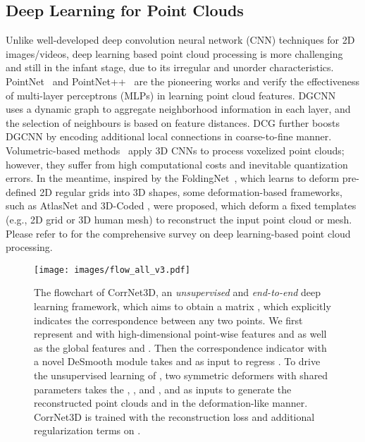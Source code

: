 \documentclass[final]{cvpr}
\begin{document}
\subsection{Deep Learning for Point Clouds}
Unlike well-developed deep convolution neural network (CNN) techniques for 2D images/videos, deep learning based point cloud processing is more challenging and still in the infant stage, due to its irregular and unorder characteristics. PointNet~\cite{qi2017pointnet} and PointNet++~\cite{qi2017pointnet++} are the pioneering works and verify the effectiveness of multi-layer perceptrons (MLPs) in learning point cloud features.
DGCNN~\cite{dgcnn} uses a dynamic graph to aggregate neighborhood information in each layer, and the selection of neighbours is based on feature distances.
DCG \cite{wang2019DCG} further boosts  DGCNN by encoding additional local connections in coarse-to-fine manner.
Volumetric-based methods~\cite{ModelNet, VoxNet,OctNet, OCNN,KD-Net} apply 3D CNNs to process voxelized point clouds; however, they suffer from high computational costs and inevitable quantization errors.
In the meantime, inspired by the FoldingNet~\cite{yang2018foldingnet}, which learns to deform pre-defined 2D regular grids into 3D shapes,
some deformation-based frameworks, such as AtlasNet \cite{groueix2018papier} and 3D-Coded \cite{groueix20183d}, were proposed, 
which deform a fixed templates (e.g., 2D grid or 3D human mesh) to reconstruct the input point cloud or mesh. Please refer to \cite{guo2020survey} for the comprehensive survey on deep learning-based point cloud processing.









\begin{figure*}[t]
  \centering
\texttt{[image: images/flow\_all\_v3.pdf]}
\caption{The flowchart of CorrNet3D, an \textit{unsupervised} and \textit{end-to-end} deep learning framework, which aims to obtain a matrix , which explicitly indicates the correspondence between any two points. We first represent  and  with high-dimensional point-wise features  and  as well as the global features  and . Then the correspondence indicator with a novel DeSmooth module takes  and  as input to regress .
To drive the unsupervised learning of , two symmetric deformers with shared parameters takes the , ,  and ,  and  as inputs to generate the reconstructed point clouds  and  in the deformation-like manner. CorrNet3D is trained with the reconstruction loss and additional regularization terms on .}
  \label{models}
\end{figure*}
\end{document}
